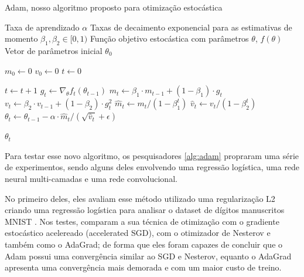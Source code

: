 \begin{algorithm}[H] %
    \caption{Adam, nosso algoritmo proposto para otimização estocástica}
    \label{alg:adam}
    \begin{algorithmic}[1] %

    \Require Taxa de aprendizado $\alpha$
    \Require Taxas de decaimento exponencial para as estimativas de momento $\beta_1, \beta_2 \in [0, 1)$
    \Require Função objetivo estocástica com parâmetros $\theta$, $f(\theta)$
    \Require Vetor de parâmetros inicial $\theta_0$

    \State $m_0 \leftarrow 0$ 
    \State $v_0 \leftarrow 0$ 
    \State $t \leftarrow 0$ 

        \State $t \leftarrow t + 1$
        \State $g_t \leftarrow \nabla_\theta f_t(\theta_{t-1})$ 
        \State $m_t \leftarrow \beta_1 \cdot m_{t-1} + (1 - \beta_1) \cdot g_t$ 
        \State $v_t \leftarrow \beta_2 \cdot v_{t-1} + (1 - \beta_2) \cdot g_t^2$ 
        \State $\hat{m}_t \leftarrow m_t / (1 - \beta_1^t)$ 
        \State $\hat{v}_t \leftarrow v_t / (1 - \beta_2^t)$ 
        \State $\theta_t \leftarrow \theta_{t-1} - \alpha \cdot \hat{m}_t / (\sqrt{\hat{v}_t} + \epsilon)$ 
    \EndWhile

    \State \Return $\theta_t$ 
    \end{algorithmic}
\end{algorithm}

Para testar esse novo algoritmo, os pesquisadores \ref{alg:adam} propraram uma série de experimentos, sendo alguns deles envolvendo uma regressão logística, uma rede neural multi-camadas e uma rede convolucional.

No primeiro deles, eles avaliam esse método utilizado uma regularização L2 criando uma regressão logística para analisar o dataset de dígitos manuscritos MNIST \parencite{AdamMethod}. Nos testes, \textcite{AdamMethod} comparam a sua técnica de otimização com o gradiente estocástico acelereado (accelerated SGD), com o otimizador de Nesterov e também como o AdaGrad; de forma que eles foram capazes de concluir que o Adam possui uma convergência similar ao SGD e Nesterov, equanto o AdaGrad apresenta uma convergência mais demorada e com um maior custo de treino.

